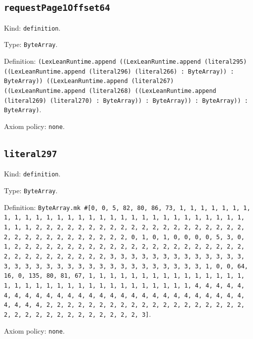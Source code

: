 \documentclass[11pt]{article}
\begin{document}
\subsection*{\texttt{requestPage1Offset64}}
\noindent Kind: \texttt{definition}.\par
\noindent Type: \texttt{ByteArray}.\par
\noindent Definition: \texttt{(LexLeanRuntime.append ((LexLeanRuntime.append (literal295) ((LexLeanRuntime.append (literal296) (literal266) : ByteArray)) : ByteArray)) ((LexLeanRuntime.append (literal267) ((LexLeanRuntime.append (literal268) ((LexLeanRuntime.append (literal269) (literal270) : ByteArray)) : ByteArray)) : ByteArray)) : ByteArray)}.\par
\noindent Axiom policy: \texttt{none}.\par
\subsection*{\texttt{literal297}}
\noindent Kind: \texttt{definition}.\par
\noindent Type: \texttt{ByteArray}.\par
\noindent Definition: \texttt{ByteArray.mk \#[0, 0, 5, 82, 80, 86, 73, 1, 1, 1, 1, 1, 1, 1, 1, 1, 1, 1, 1, 1, 1, 1, 1, 1, 1, 1, 1, 1, 1, 1, 1, 1, 1, 1, 1, 1, 1, 1, 1, 1, 2, 2, 2, 2, 2, 2, 2, 2, 2, 2, 2, 2, 2, 2, 2, 2, 2, 2, 2, 2, 2, 2, 2, 2, 2, 2, 2, 2, 2, 2, 2, 2, 0, 1, 0, 1, 0, 0, 0, 0, 5, 3, 0, 1, 2, 2, 2, 2, 2, 2, 2, 2, 2, 2, 2, 2, 2, 2, 2, 2, 2, 2, 2, 2, 2, 2, 2, 2, 2, 2, 2, 2, 2, 2, 2, 2, 3, 3, 3, 3, 3, 3, 3, 3, 3, 3, 3, 3, 3, 3, 3, 3, 3, 3, 3, 3, 3, 3, 3, 3, 3, 3, 3, 3, 3, 3, 3, 3, 1, 0, 0, 64, 16, 0, 135, 80, 81, 67, 1, 1, 1, 1, 1, 1, 1, 1, 1, 1, 1, 1, 1, 1, 1, 1, 1, 1, 1, 1, 1, 1, 1, 1, 1, 1, 1, 1, 1, 1, 1, 1, 1, 4, 4, 4, 4, 4, 4, 4, 4, 4, 4, 4, 4, 4, 4, 4, 4, 4, 4, 4, 4, 4, 4, 4, 4, 4, 4, 4, 4, 4, 4, 4, 4, 2, 2, 2, 2, 2, 2, 2, 2, 2, 2, 2, 2, 2, 2, 2, 2, 2, 2, 2, 2, 2, 2, 2, 2, 2, 2, 2, 2, 2, 2, 2, 2, 3]}.\par
\noindent Axiom policy: \texttt{none}.\par
\end{document}
